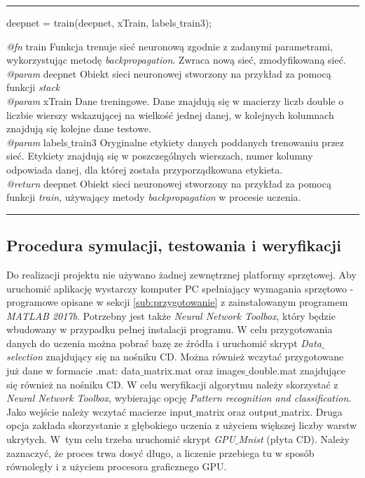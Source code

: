 \vspace{1cm}
\hrule
\vspace{1cm}

\noindent deepnet = train(deepnet, xTrain, labels$\_$train3);
\vspace{1cm}

\noindent \textit{@fn} train Funkcja trenuje sieć neuronową zgodnie z zadanymi parametrami, wykorzystując metodę \textit{backpropagation}. Zwraca nową sieć, zmodyfikowaną sieć.
\\ \textit{@param} deepnet Obiekt sieci neuronowej stworzony na przykład za pomocą funkcji \textit{stack}
\\ \textit{@param} xTrain Dane treningowe. Dane znajdują się w macierzy liczb double o liczbie wierszy wskazującej na wielkość jednej danej, w kolejnych kolumnach znajdują się kolejne dane testowe.
\\ \textit{@param} labels$\_$train3 Oryginalne etykiety danych poddanych trenowaniu przez sieć. Etykiety znajdują się w poszczególnych wierszach, numer kolumny odpowiada danej, dla której została przyporządkowana etykieta.
\\ \textit{@return} deepnet Obiekt sieci neuronowej stworzony na przykład za pomocą funkcji \textit{train}, używający metody \textit{backpropagation} w procesie uczenia.

\vspace{1cm}
\hrule
\vspace{1cm}



\subsection{Procedura symulacji, testowania i weryfikacji}
\label{sub:procedura}

Do realizacji projektu nie używano żadnej zewnętrznej platformy sprzętowej. Aby uruchomić aplikację wystarczy komputer PC spełniający wymagania sprzętowo - programowe opisane w sekcji \ref{sub:przygotowanie} z zainstalowanym programem \textit{MATLAB 2017b}. Potrzebny jest także \textit{Neural Network Toolbox}, który będzie wbudowany w przypadku pełnej instalacji programu. W celu przygotowania danych do uczenia można pobrać bazę ze źródła \cite{baza} i uruchomić skrypt \textit{Data$\_$selection} znajdujący się na nośniku CD. Można również wczytać przygotowane już dane w formacie .mat: data$\_$matrix.mat oraz images$\_$double.mat znajdujące się również na nośniku CD. W celu weryfikacji algorytmu należy skorzystać z \textit{Neural Network Toolbox}, wybierając opcję \textit{Pattern recognition and classification}. Jako wejście należy wczytać macierze input$\_$matrix oraz output$\_$matrix. Druga opcja zakłada skorzystanie z głębokiego uczenia z użyciem większej liczby warstw ukrytych. W~tym celu trzeba uruchomić skrypt \textit{GPU$\_$Mnist} (płyta CD). Należy zaznaczyć, że proces trwa dosyć długo, a liczenie przebiega tu w sposób równoległy i z użyciem procesora graficznego GPU.

